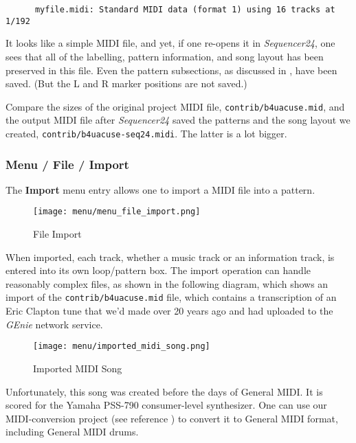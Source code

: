    \begin{verbatim}
      myfile.midi: Standard MIDI data (format 1) using 16 tracks at 1/192
   \end{verbatim}

   It looks like a simple MIDI file, and yet, if one re-opens it in
   \textsl{Sequencer24}, one sees that all of the labelling, pattern information,
   and song layout has been preserved in this file.
   Even the pattern subsections, as discussed in
   ,
   have been saved.
   (But the L and R marker positions are not saved.)

   Compare the sizes of the original project MIDI file,
   \texttt{contrib/b4uacuse.mid}, and the output MIDI file after
   \textsl{Sequencer24} saved the patterns and the song layout we created,
   \texttt{contrib/b4uacuse-seq24.midi}.  The latter is a lot
   bigger.  

\subsubsection{Menu / File / Import}
\label{subsubsec:seq24_menu_file_import}

   The \textbf{Import} menu entry allows one to import a MIDI file
   into a pattern.

\begin{figure}[H]
   \centering 
   \texttt{[image: menu/menu\_file\_import.png]}
   \caption{File Import}
   \label{fig:seq24_menu_file_import}
\end{figure}

   When imported, each track, whether a music track or an information track,
   is entered into its own loop/pattern box.  The import operation can
   handle reasonably complex files, as shown in the following diagram, which
   shows an import of the \texttt{contrib/b4uacuse.mid} file, which contains
   a transcription of an Eric Clapton tune that we'd made over 20 
   years ago and had uploaded to the \textsl{GEnie} network service.

\begin{figure}[H]
   \centering 
   \texttt{[image: menu/imported\_midi\_song.png]}
   \caption{Imported MIDI Song}
   \label{fig:seq24_imported_midi_song}
\end{figure}

   Unfortunately, this song was created before the days of General MIDI.
   It is scored for the Yamaha PSS-790 consumer-level synthesizer.
   One can use our MIDI-conversion project (see reference \cite{midicvt}) 
   to convert it to General MIDI format, including General MIDI drums.


